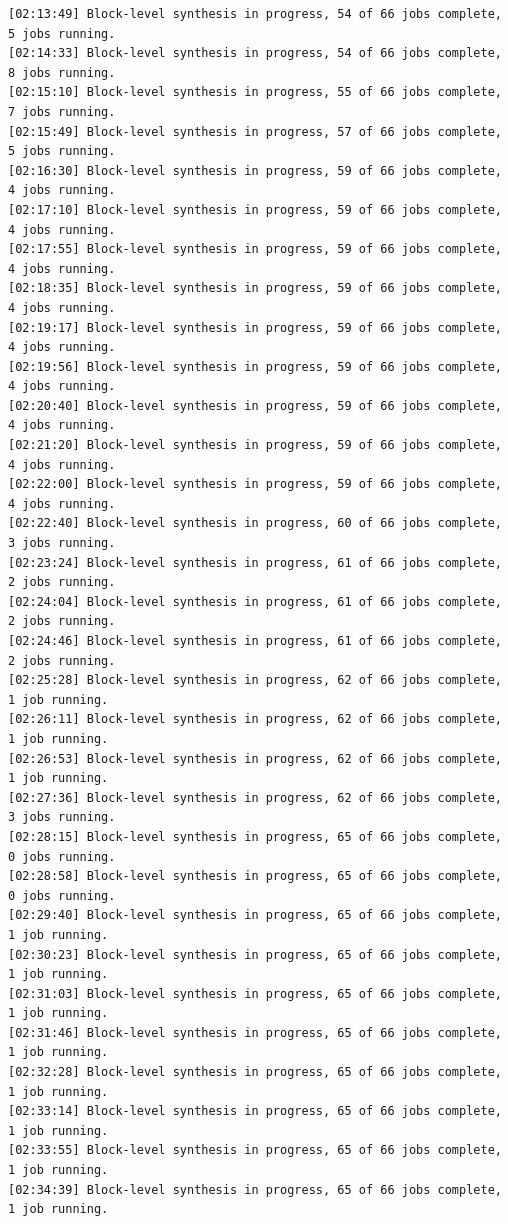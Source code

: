 \begin{lstlisting}[label=code, basicstyle=\tiny, caption=Листинг файла v++\_vinc.log]
[02:13:49] Block-level synthesis in progress, 54 of 66 jobs complete, 5 jobs running.
[02:14:33] Block-level synthesis in progress, 54 of 66 jobs complete, 8 jobs running.
[02:15:10] Block-level synthesis in progress, 55 of 66 jobs complete, 7 jobs running.
[02:15:49] Block-level synthesis in progress, 57 of 66 jobs complete, 5 jobs running.
[02:16:30] Block-level synthesis in progress, 59 of 66 jobs complete, 4 jobs running.
[02:17:10] Block-level synthesis in progress, 59 of 66 jobs complete, 4 jobs running.
[02:17:55] Block-level synthesis in progress, 59 of 66 jobs complete, 4 jobs running.
[02:18:35] Block-level synthesis in progress, 59 of 66 jobs complete, 4 jobs running.
[02:19:17] Block-level synthesis in progress, 59 of 66 jobs complete, 4 jobs running.
[02:19:56] Block-level synthesis in progress, 59 of 66 jobs complete, 4 jobs running.
[02:20:40] Block-level synthesis in progress, 59 of 66 jobs complete, 4 jobs running.
[02:21:20] Block-level synthesis in progress, 59 of 66 jobs complete, 4 jobs running.
[02:22:00] Block-level synthesis in progress, 59 of 66 jobs complete, 4 jobs running.
[02:22:40] Block-level synthesis in progress, 60 of 66 jobs complete, 3 jobs running.
[02:23:24] Block-level synthesis in progress, 61 of 66 jobs complete, 2 jobs running.
[02:24:04] Block-level synthesis in progress, 61 of 66 jobs complete, 2 jobs running.
[02:24:46] Block-level synthesis in progress, 61 of 66 jobs complete, 2 jobs running.
[02:25:28] Block-level synthesis in progress, 62 of 66 jobs complete, 1 job running.
[02:26:11] Block-level synthesis in progress, 62 of 66 jobs complete, 1 job running.
[02:26:53] Block-level synthesis in progress, 62 of 66 jobs complete, 1 job running.
[02:27:36] Block-level synthesis in progress, 62 of 66 jobs complete, 3 jobs running.
[02:28:15] Block-level synthesis in progress, 65 of 66 jobs complete, 0 jobs running.
[02:28:58] Block-level synthesis in progress, 65 of 66 jobs complete, 0 jobs running.
[02:29:40] Block-level synthesis in progress, 65 of 66 jobs complete, 1 job running.
[02:30:23] Block-level synthesis in progress, 65 of 66 jobs complete, 1 job running.
[02:31:03] Block-level synthesis in progress, 65 of 66 jobs complete, 1 job running.
[02:31:46] Block-level synthesis in progress, 65 of 66 jobs complete, 1 job running.
[02:32:28] Block-level synthesis in progress, 65 of 66 jobs complete, 1 job running.
[02:33:14] Block-level synthesis in progress, 65 of 66 jobs complete, 1 job running.
[02:33:55] Block-level synthesis in progress, 65 of 66 jobs complete, 1 job running.
[02:34:39] Block-level synthesis in progress, 65 of 66 jobs complete, 1 job running.

\end{lstlisting}
